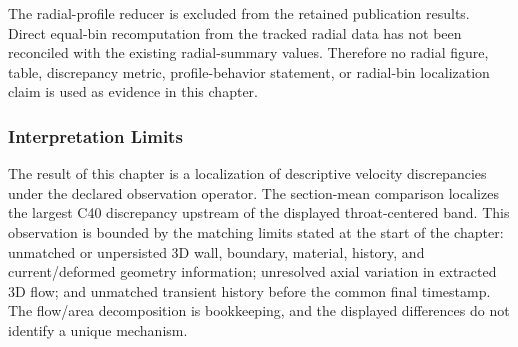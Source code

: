 The radial-profile reducer is excluded from the retained publication results.
Direct equal-bin recomputation from the tracked radial data has not been
reconciled with the existing radial-summary values. Therefore no radial figure,
table, discrepancy metric, profile-behavior statement, or radial-bin
localization claim is used as evidence in this chapter.

\subsubsection{Interpretation Limits}
\label{subsec:spatial-localization-discrepancies}

The result of this chapter is a localization of descriptive velocity
discrepancies under the declared observation operator. The section-mean
comparison localizes the largest C40 discrepancy upstream of the displayed
throat-centered band. This observation is bounded by the matching limits stated
at the start of the chapter: unmatched or unpersisted 3D wall, boundary,
material, history, and current/deformed geometry information; unresolved axial
variation in extracted 3D flow; and unmatched transient history before the
common final timestamp. The flow/area decomposition is bookkeeping, and the
displayed differences do not identify a unique mechanism.
